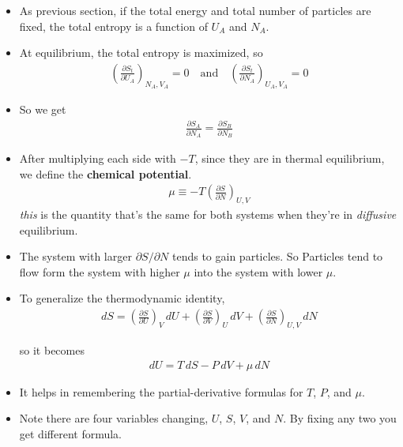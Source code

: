 \documentclass{book}
\begin{document}
\begin{itemize}
	\item As previous section, if the total energy and total number of particles are fixed, the total entropy is a
	      function of $ U_{A} $ and $ N_{A} $.
	\item At equilibrium, the total entropy is maximized, so
	      \begin{align}
		      \left( \frac{\partial S_{t}}{\partial U_{A}} \right)_{N_A, V_A} = 0
		      \quad \text{and} \quad
		      \left( \frac{\partial S_{t}}{\partial N_{A}} \right)_{U_A, V_A} = 0
	      \end{align}
	\item So we get
	      \begin{align}
		      \frac{\partial S_{A}}{\partial N_{A}} = \frac{\partial S_{B}}{\partial N_{B}}
	      \end{align}
	\item After multiplying each side with $-T$, since they are in thermal equilibrium, we define the
	      \textbf{chemical potential}.
	      \begin{align}
		      \label{eq:chemical potential}
		      \mu \equiv -T \left( \frac{\partial S}{\partial N} \right)_{U,V}
	      \end{align}
	      \textit{this} is the quantity that's the same for both systems when they're in \textit{diffusive} equilibrium.
	\item The system with larger $ \partial S/ \partial N$ tends to gain particles. So Particles tend to flow
	      form the system with higher $ \mu $ into the system with lower $ \mu $.
	\item To generalize the thermodynamic identity,
	      \begin{align}
		      dS = \left( \frac{\partial S}{\partial U} \right)_{V} \, dU
		      + \left( \frac{\partial S}{\partial V} \right)_{U}\, dV
		      + \left( \frac{\partial S}{\partial N} \right)_{U, V} \, dN
	      \end{align}

				so it becomes
				\begin{align}
					\label{eq:thermo identity with N}
					dU = T\, dS - P\, dV + \mu \, dN
				\end{align}
	\item It helps in remembering the partial-derivative formulas for $ T $, $ P $, and $ \mu $.
	\item Note there are four variables changing, $ U $, $ S $, $ V $, and $ N $. By fixing any two you get different
				formula.










\end{itemize}
\end{document}
